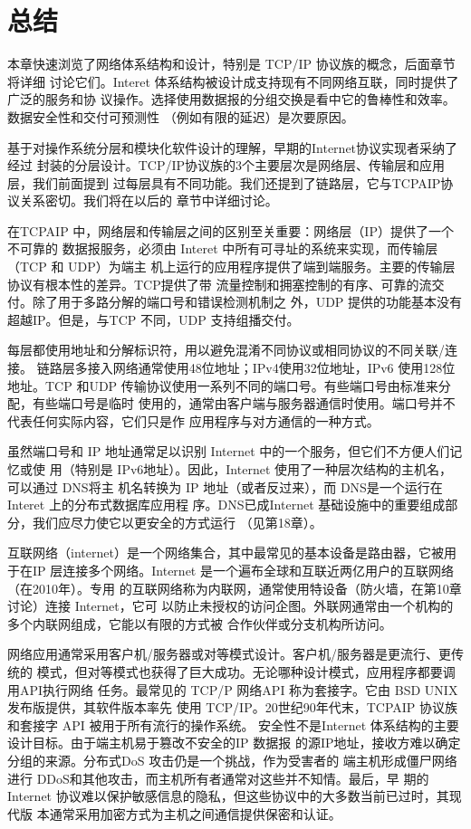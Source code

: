 \section{总结}
本章快速浏览了网络体系结构和设计，特别是 TCP/IP 协议族的概念，后面章节将详细
讨论它们。Interet 体系结构被设计成支持现有不同网络互联，同时提供了广泛的服务和协
议操作。选择使用数据报的分组交换是看中它的鲁棒性和效率。数据安全性和交付可预测性
（例如有限的延迟）是次要原因。

基于对操作系统分层和模块化软件设计的理解，早期的Internet协议实现者采纳了经过
封装的分层设计。TCP/IP协议族的3个主要层次是网络层、传输层和应用层，我们前面提到
过每层具有不同功能。我们还提到了链路层，它与TCPAIP协议关系密切。我们将在以后的
章节中详细讨论。

在TCPAIP 中，网络层和传输层之间的区别至关重要：网络层（IP）提供了一个不可靠的
数据报服务，必须由 Interet 中所有可寻址的系统来实现，而传输层（TCP 和 UDP）为端主
机上运行的应用程序提供了端到端服务。主要的传输层协议有根本性的差异。TCP提供了带
流量控制和拥塞控制的有序、可靠的流交付。除了用于多路分解的端口号和错误检测机制之
外，UDP 提供的功能基本没有超越IP。但是，与TCP 不同，UDP 支持组播交付。

每层都使用地址和分解标识符，用以避免混淆不同协议或相同协议的不同关联/连接。
链路层多接入网络通常使用48位地址；IPv4使用32位地址，IPv6 使用128位地址。TCP
和UDP 传输协议使用一系列不同的端口号。有些端口号由标准来分配，有些端口号是临时
使用的，通常由客户端与服务器通信时使用。端口号并不代表任何实际内容，它们只是作
应用程序与对方通信的一种方式。

虽然端口号和 IP 地址通常足以识别 Internet 中的一个服务，但它们不方便人们记忆或使
用（特别是 IPv6地址）。因此，Internet 使用了一种层次结构的主机名，可以通过 DNS将主
机名转换为 IP 地址（或者反过来），而 DNS是一个运行在 Interet 上的分布式数据库应用程
序。DNS已成Internet 基础设施中的重要组成部分，我们应尽力使它以更安全的方式运行
（见第18章）。

互联网络（internet）是一个网络集合，其中最常见的基本设备是路由器，它被用于在IP
层连接多个网络。Internet 是一个遍布全球和互联近两亿用户的互联网络（在2010年）。专用
的互联网络称为内联网，通常使用特设备（防火墙，在第10章讨论）连接 Internet，它可
以防止未授权的访问企图。外联网通常由一个机构的多个内联网组成，它能以有限的方式被
合作伙伴或分支机构所访问。

网络应用通常采用客户机/服务器或对等模式设计。客户机/服务器是更流行、更传统的
模式，但对等模式也获得了巨大成功。无论哪种设计模式，应用程序都要调用API执行网络
任务。最常见的 TCP/P 网络API 称为套接字。它由 BSD UNIX 发布版提供，其软件版本率先
使用 TCP/IP。20世纪90年代末，TCPAIP 协议族和套接字 API 被用于所有流行的操作系统。
安全性不是Internet 体系结构的主要设计目标。由于端主机易于篡改不安全的IP 数据报
的源IP地址，接收方难以确定分组的来源。分布式DoS 攻击仍是一个挑战，作为受害者的
端主机形成僵尸网络进行 DDoS和其他攻击，而主机所有者通常对这些并不知情。最后，早
期的 Internet 协议难以保护敏感信息的隐私，但这些协议中的大多数当前已过时，其现代版
本通常采用加密方式为主机之间通信提供保密和认证。

